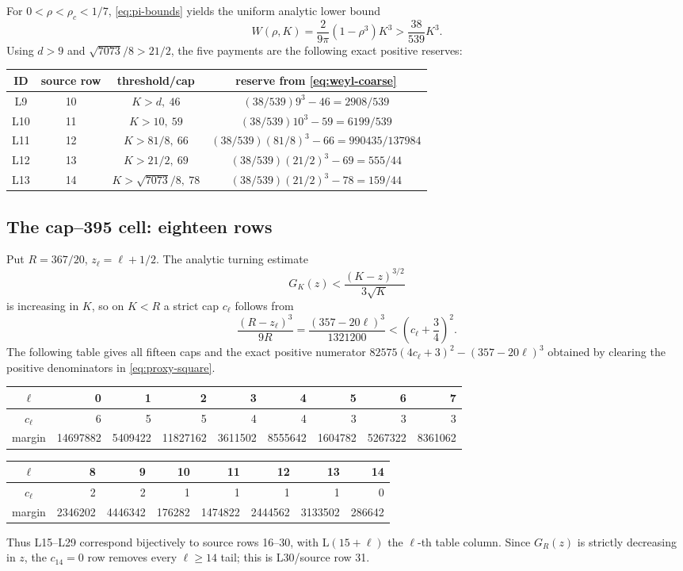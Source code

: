 \documentclass[11pt]{article}
\newcommand{\rc}{\rho _c}
\begin{document}
For \(0<\rho<\rc<1/7\), \eqref{eq:pi-bounds} yields the uniform analytic
lower bound
\begin{equation}
 W(\rho,K)=\frac{2}{9\pi}(1-\rho^3)K^3
 >\frac{38}{539}K^3.
 \label{eq:weyl-coarse}
\end{equation}
Using \(d>9\) and \(\sqrt{7073}/8>21/2\), the five payments are the
following exact positive reserves:
\begin{center}
\begin{tabular}{c|c|c|c}
\toprule
ID&source row&threshold/cap&reserve from \eqref{eq:weyl-coarse}\\
\midrule
L9&10&\(K>d,\ 46\)&\((38/539)9^3-46=2908/539\)\\
L10&11&\(K>10,\ 59\)&\((38/539)10^3-59=6199/539\)\\
L11&12&\(K>81/8,\ 66\)&\((38/539)(81/8)^3-66=990435/137984\)\\
L12&13&\(K>21/2,\ 69\)&\((38/539)(21/2)^3-69=555/44\)\\
L13&14&\(K>\sqrt{7073}/8,\ 78\)&\((38/539)(21/2)^3-78=159/44\)\\
\bottomrule
\end{tabular}
\end{center}

\subsection{The cap--395 cell: eighteen rows}

Put \(R=367/20\), \(z_\ell=\ell+1/2\).  The analytic turning estimate
\[
 G_K(z)<\frac{(K-z)^{3/2}}{3\sqrt K}
\]
is increasing in \(K\), so on \(K<R\) a strict cap \(c_\ell\) follows
from
\begin{equation}
 \frac{(R-z_\ell)^3}{9R}
 =\frac{(357-20\ell)^3}{1321200}
 <\left(c_\ell+\frac34\right)^2.
 \label{eq:proxy-square}
\end{equation}
The following table gives all fifteen caps and the exact positive numerator
\(82575(4c_\ell+3)^2-(357-20\ell)^3\) obtained by clearing the
positive denominators in \eqref{eq:proxy-square}.
\begin{center}
\scriptsize
\begin{tabular}{c|rrrrrrrr}
\toprule
\(\ell\)&0&1&2&3&4&5&6&7\\
\midrule
\(c_\ell\)&6&5&5&4&4&3&3&3\\
margin
&14697882&5409422&11827162&3611502&8555642
&1604782&5267322&8361062\\
\bottomrule
\end{tabular}

\medskip
\begin{tabular}{c|rrrrrrr}
\toprule
\(\ell\)&8&9&10&11&12&13&14\\
\midrule
\(c_\ell\)&2&2&1&1&1&1&0\\
margin&2346202&4446342&176282&1474822&2444562&3133502&286642\\
\bottomrule
\end{tabular}
\end{center}
Thus L15--L29 correspond bijectively to source rows 16--30, with
L\((15+\ell)\) the \(\ell\)-th table column.  Since \(G_R(z)\) is
strictly decreasing in \(z\), the \(c_{14}=0\) row removes every
\(\ell\ge14\) tail; this is L30/source row 31.
\end{document}
